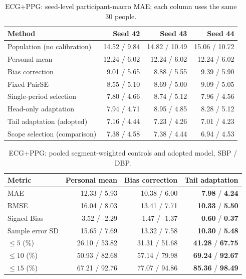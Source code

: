 \documentclass[conference]{IEEEtran}
\begin{document}
\begin{table}[!ht]\centering\scriptsize\caption{ECG+PPG: seed-level participant-macro MAE; each column uses the same 30 people.}
\begin{tabular}{lrrr}\toprule Method & Seed 42 & Seed 43 & Seed 44\\\midrule
Population (no calibration) & 14.52 / 9.84 & 14.82 / 10.49 & 15.06 / 10.72\\
Personal mean & 12.24 / 6.02 & 12.24 / 6.02 & 12.24 / 6.02\\
Bias correction & 9.01 / 5.65 & 8.88 / 5.55 & 9.39 / 5.90\\
Fixed PairSE & 8.55 / 5.10 & 8.69 / 5.00 & 9.09 / 5.05\\
Single-period selection & 7.80 / 4.66 & 8.74 / 5.12 & 7.96 / 4.56\\
Head-only adaptation & 7.94 / 4.71 & 8.95 / 4.85 & 8.28 / 5.12\\
Tail adaptation (adopted) & 7.16 / 4.44 & 7.23 / 4.26 & 7.01 / 4.23\\
Scope selection (comparison) & 7.38 / 4.58 & 7.38 / 4.44 & 6.94 / 4.53\\
\bottomrule\end{tabular}\end{table}
\begin{table}[!ht]\centering\scriptsize\caption{ECG+PPG: pooled segment-weighted controls and adopted model, SBP / DBP.}\scriptsize
\begin{tabular}{lrrr}\toprule
Metric & Personal mean & Bias correction & Tail adaptation\\\midrule
MAE & 12.33 / 5.93 & 10.38 / 6.00 & \textbf{7.98} / \textbf{4.24}\\
RMSE & 16.04 / 8.03 & 13.41 / 7.71 & \textbf{10.33} / \textbf{5.50}\\
Signed Bias & -3.52 / -2.29 & -1.47 / -1.37 & \textbf{0.60} / \textbf{0.37}\\
Sample error SD & 15.65 / 7.69 & 13.32 / 7.58 & \textbf{10.30} / \textbf{5.48}\\
$\leq5$ (\%) & 26.10 / 53.82 & 31.31 / 51.68 & \textbf{41.28} / \textbf{67.75}\\
$\leq10$ (\%) & 50.93 / 82.68 & 57.14 / 79.98 & \textbf{69.24} / \textbf{92.67}\\
$\leq15$ (\%) & 67.21 / 92.76 & 77.07 / 94.86 & \textbf{85.36} / \textbf{98.49}\\
\bottomrule\end{tabular}\end{table}
\end{document}

